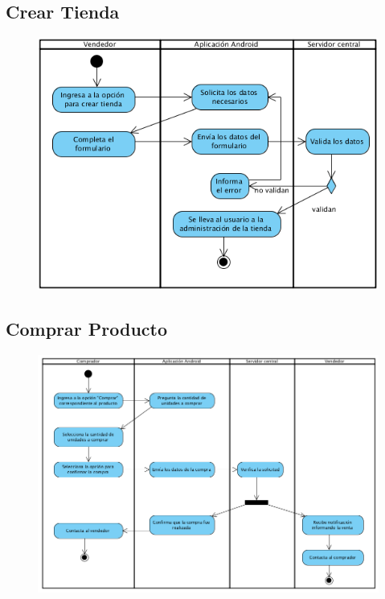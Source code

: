 \subsection{Crear Tienda}

\begin{figure}[H]
  \centering
    \includegraphics{imagenes/analisis/diagrama-actividad-crear-tienda.png}
    \label{fig:diagrama-actividad-crear-tienda}
\end{figure}

\subsection{Comprar Producto}

\begin{figure}[H]
  \centering
    \includegraphics[width=1\textwidth]{imagenes/analisis/actividad-comprar-producto.png}
    \label{fig:diagrama-actividad-comprar-producto}
\end{figure}


